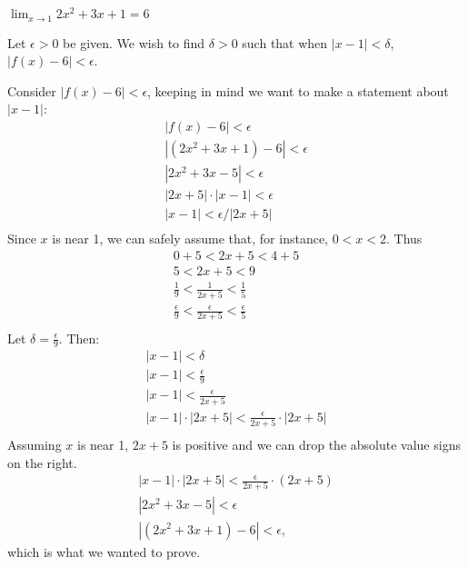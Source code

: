 {$\displaystyle \lim_{x\to 1} 2x^2+3x+1 = 6$}
{Let $\epsilon >0$ be given. We wish to find $\delta >0$ such that when $|x-1|<\delta$, $|f(x)-6|<\epsilon$. 

Consider $|f(x)-6|<\epsilon$, keeping in  mind we want to make a statement about $|x-1|$:
\begin{gather*}
|f(x) -6 | < \epsilon \\
|(2x^2+3x+1)-6 |<\epsilon \\
| 2x^2+3x-5 | < \epsilon \\
| 2x+5 |\cdot|x-1| < \epsilon \\
| x-1 | < \epsilon/|2x+5| \\
\end{gather*}
Since $x$ is near 1, we can safely assume that, for instance, $0<x<2$. Thus
\begin{gather*}
0+5<2x+5<4+5 \\
5 < 2x+5 < 9 \\
\frac{1}{9} < \frac{1}{2x+5} < \frac{1}{5} \\
\frac{\epsilon}{9} < \frac{\epsilon}{2x+5} < \frac{\epsilon}{5} \\
\end{gather*}
Let $\delta =\frac{\epsilon}{9}$. Then:
\begin{gather*}
|x-1|<\delta \\
|x-1| < \frac{\epsilon}{9}\\
|x-1| < \frac{\epsilon}{2x+5}\\
|x-1|\cdot|2x+5| < \frac{\epsilon}{2x+5}\cdot|2x+5|\\
\end{gather*}
Assuming $x$ is near 1, $2x+5$ is positive and we can drop the absolute value signs on the right.
\begin{gather*}
|x-1|\cdot|2x+5| < \frac{\epsilon}{2x+5}\cdot(2x+5)\\
|2x^2+3x-5| < \epsilon\\
|(2x^2+3x+1) -6| < \epsilon,
\end{gather*}
which is what we wanted to prove.
}


